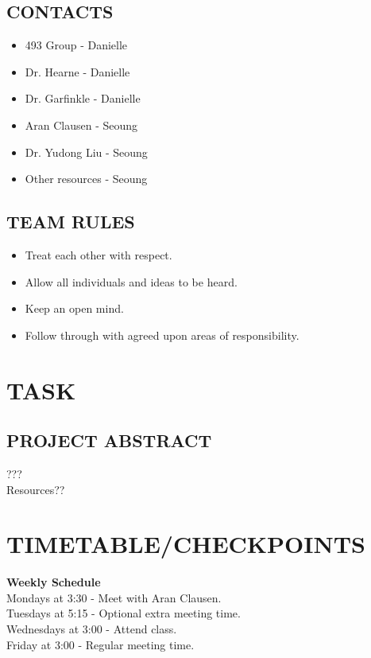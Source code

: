 \documentclass[11pt]{article}
\begin{document}
\subsection{CONTACTS}
\begin{itemize}
	\item 493 Group - Danielle
	\item Dr. Hearne - Danielle
	\item Dr. Garfinkle - Danielle
	\item Aran Clausen - Seoung
	\item Dr. Yudong Liu - Seoung
	\item Other resources - Seoung
\end{itemize}
    
\subsection{TEAM RULES}
\begin{itemize}
	\item Treat each other with respect.
	\item Allow all individuals and ideas to be heard.
	\item Keep an open mind.
	\item Follow through with agreed upon areas of responsibility.
\end{itemize}

\section{TASK}
\subsection{PROJECT ABSTRACT}
???\\
Resources??

\section{TIMETABLE/CHECKPOINTS}
\textbf{Weekly Schedule}\\
Mondays at 3:30 - Meet with Aran Clausen.\\
Tuesdays at 5:15 - Optional extra meeting time.\\
Wednesdays at 3:00 - Attend class.\\
Friday at 3:00 - Regular meeting time.\\
\end{document}

